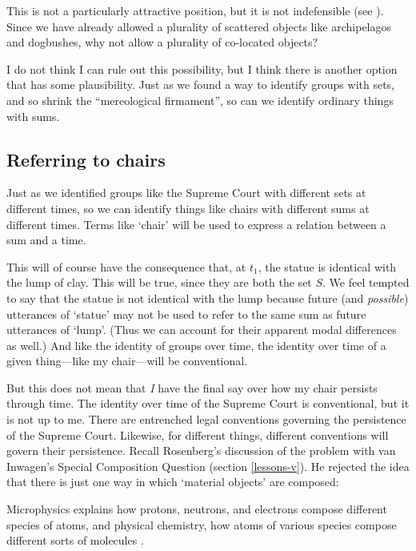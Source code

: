 \documentclass[11pt]{article}
\newenvironment{squote}{%
\begin{spacing}{1}
\begin{list}{}{%
\setlength{\labelwidth}{0pt}%
\rightmargin\leftmargin%
}
\item\relax
}{%
\end{list}%
\end{spacing}
}
\begin{document}
\begin{spacing}{1.5}
This is not a particularly attractive position, but it is not
indefensible (see \citet{bennett2004}).  Since we have already allowed
a plurality of scattered objects like archipelagos and dogbushes, why
not allow a plurality of co-located objects?

I do not think I can rule out this possibility, but I think there is
another option that has some plausibility.  Just as we found a way to
identify groups with sets, and so shrink the ``mereological
firmament'', so can we identify ordinary things with sums.

\subsection{Referring to chairs}
\label{chair-ref}
Just as we identified groups like the Supreme Court with different
sets at different times, so we can identify things like chairs with
different sums at different times.  Terms like `chair' will be used to
express a relation between a sum and a time.

This will of course have the consequence that, at $t_1$, the statue is
identical with the lump of clay.  This will be true, since they are
both the set $S$.  We feel tempted to say that the statue is not
identical with the lump because future (and {\em possible}) utterances
of `statue' may not be used to refer to the same sum as future
utterances of `lump'.  (Thus we can account for their apparent modal
differences as well.)  And like the identity of groups over time, the
identity over time of a given thing---like my chair---will be
conventional.

But this does not mean that {\em I} have the final say over how my
chair persists through time.  The identity over time of the Supreme
Court is conventional, but it is not up to me.  There are entrenched
legal conventions governing the persistence of the Supreme Court.
Likewise, for different things, different conventions will govern
their persistence.  Recall Rosenberg's discussion of the problem with
van Inwagen's Special Composition Question (section \ref{lessons-v}).
He rejected the idea that there is just one way in which `material
objects' are composed:

\begin{squote}
Microphysics explains how protons, neutrons, and electrons compose
different species of atoms, and physical chemistry, how atoms of
various species compose different sorts of molecules
\citep[706]{rosenberg1993}.
\end{squote}


\end{spacing}
\end{document}
